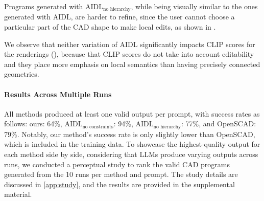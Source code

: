 Programs generated with $\text{AIDL}_{\text{no hierarchy}}$, while being visually similar to the ones generated with $\text{AIDL}$, are harder to refine, since the user cannot choose a particular part of the CAD shape to make local edits, as shown in .

We observe that neither variation of AIDL significantly impacts CLIP scores for the renderings (), because that CLIP scores do not take into account editability and they place more emphasis on local semantics than having precisely connected geometries.


\paragraph{Results Across Multiple Runs} All methods produced at least one valid output per prompt, with success rates as follows: ours: 64\%, $\text{AIDL}_{\text{no constraints}}$: 94\%, $\text{AIDL}_{\text{no hierarchy}}$: 77\%, and OpenSCAD: 79\%. Notably, our method's success rate is only slightly lower than OpenSCAD, which is included in the training data. To showcase the highest-quality output for each method side by side, considering that LLMs produce varying outputs across runs, we conducted a perceptual study to rank the valid CAD programs generated from the 10 runs per method and prompt. The study details are discussed in \cref{app:study}, and the results are provided in the supplemental material.

